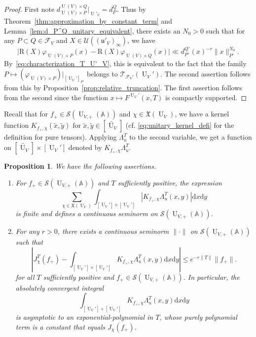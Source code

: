 \documentclass[letterpaper,11pt]{amsart}
\newcommand{\fu}{\mathfrak{u}}
\newcommand{\fX}{\mathfrak{X}}
\newcommand{\bA}{\mathbb{A}}
\newcommand{\cF}{\mathcal{F}}
\newcommand{\cS}{\mathcal{S}}
\newcommand{\cT}{\mathcal{T}}
\newcommand{\cU}{\mathcal{U}}
\newcommand{\rd}{\mathrm{d}}
\newcommand{\<}{\negthickspace}
\providecommand{\abs}[1]{\lvert#1\rvert}
\providecommand{\aabs}[1]{\lVert#1\rVert}
\DeclareMathOperator{\U}{U}
\theoremstyle{definition}
\theoremstyle{plain}
\newtheorem{prop}[definition]{Proposition}
\theoremstyle{remark}
\numberwithin{equation}{section}
\begin{document}
\begin{proof}
First note $ d_{\U(V) \times P}^{\U(V) \times Q}|_{\U'_V}  = d_{P}^{Q}$. Thus by Theorem~\ref{thm:approximation_by_constant_term} and
Lemma~\ref{lem:d_P^Q_unitary_equivalent}, there exists an $N_0>0$ such that for any $P \subset Q \in \cF_V$ and $X \in \cU
((\fu'_V)_\infty)$, we have
    \begin{equation} \label{eq:IY_suffices}
    \abs{ \mathrm{R}(X) \varphi_{\U(V) \times P}(x)
    - \mathrm{R}(X) \varphi_{\U(V) \times Q}(x)}
    \ll d_{P'}^{Q'}(x)^{-r} \|x\|_{P'}^{N_0}.
    \end{equation}
By~\eqref{eq:characterization_T_U'_V},
this is equivalent to the fact that the family $P \mapsto  \left( \varphi_{\U(V) \times P}\right) |_{[\U_V']_{P'}}$
belongs to $\cT_{\cF_V'}(\U_V')$. The second assertion follows from this by Proposition~\ref{prop:relative_truncation}. The first assertion follows from the second since the function $x \mapsto F^{\U_V'}(x,T)$ is compactly supported.
\end{proof}

Recall that for $f_+ \in \cS(\U_{V,+}(\bA))$ and $\chi \in \fX(\U_V)$, we have a
kernel function $K_{f_+,\chi}(\widetilde{x},\widetilde{y})$ for
$\widetilde{x},\widetilde{y} \in [\widetilde{\U_V}]$ (cf. \eqref{eq:unitary_kernel_defi} for the definition for pure tensors). Applying $\Lambda_u^T$ to
the second variable, we get a function on $[\widetilde{\U_V}] \times [\U_V']$
denoted by $K_{f_+,\chi} \Lambda^T_u$.

\begin{prop}    \label{prop:comparison_of_asymptotics}
We have the following assertions.
    \begin{enumerate}
        \item For $f_+ \in \cS(\U_{V, +}(\bA))$ and $T$ sufficiently positive,
            the expression
        \[
        \sum_{\chi \in \fX(\U_V)} \int_{[\U_V'] \times [\U_V']}
        \left| K_{f_+,\chi}\Lambda^T_u (x,y) \right| \rd x \rd y
        \]
        is finite and defines a continuous seminorm on $\cS(\U_{V,
        +}(\bA))$.

        \item For any $r>0$, there exists a continuous seminorm
            $\aabs{\cdot}$ on $\cS(\U_{V, +}(\bA))$ such that
        \[
        \left| J_\chi^T(f_+) - \int_{[\U_V'] \times [\U_V']}
        K_{f_+,\chi}\Lambda^T_u (x,y) \rd x \rd y  \right|
        \le e^{-r\|T\|} \|f_+\|.
        \]
        for all $T$ sufficiently positive and $f_+ \in \cS(\U_{V,
        +}(\bA))$. In particular, the absolutely convergent integral
        \[
        \int_{[\U_V'] \times [\U_V']} K_{f_+,\chi}
        \Lambda^T_u (x,y) \rd x \rd y
        \]
        is asymptotic to an exponential-polynomial in $T$, whose purely
        polynomial term is a constant that equals $J_\chi(f_+)$.
    \end{enumerate}
\end{prop}
\end{document}

